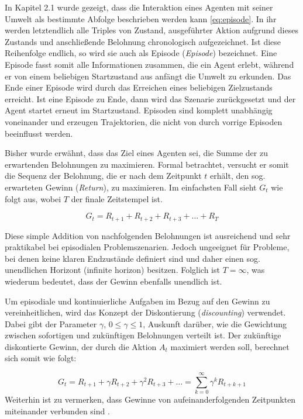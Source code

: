 In Kapitel 2.1 wurde gezeigt, dass die Interaktion eines Agenten mit seiner Umwelt als bestimmte Abfolge beschrieben werden kann \eqref{eq:episode}. In ihr werden letztendlich alle Triples von Zustand, ausgeführter Aktion aufgrund dieses Zustands und anschließende Belohnung chronologisch aufgezeichnet. Ist diese Reihenfolge endlich, so wird sie auch als Episode (\textit{Episode}) bezeichnet. Eine Episode fasst somit alle Informationen zusammen, die ein Agent erlebt, während er von einem beliebigen Startzustand aus anfängt die Umwelt zu erkunden. Das Ende einer Episode wird durch das Erreichen eines beliebigen Zielzustands erreicht. Ist eine Episode zu Ende, dann wird das Szenarie zurückgesetzt und der Agent startet erneut im Startzustand. Episoden sind komplett unabhängig voneinander und erzeugen Trajektorien, die nicht von durch vorrige Episoden beeinflusst werden.
\par
Bisher wurde erwähnt, dass das Ziel eines Agenten sei, die Summe der zu erwartenden Belohnungen zu maximieren. Formal betrachtet, versucht er somit die Sequenz der Belohnung, die er nach dem Zeitpunkt $t$ erhält, den sog. erwarteten Gewinn (\textit{Return}), zu maximieren. Im einfachsten Fall sieht $G_t$ wie folgt aus, wobei $T$ der finale Zeitstempel ist.

\begin{equation}\label{eq:simpleReturn}
    G_t = R_{t+1} + R_{t+2} + R_{t+3} + \dots + R_{T}
\end{equation}

Diese simple Addition von nachfolgenden Belohnungen ist ausreichend und sehr praktikabel bei episodialen Problemszenarien. Jedoch ungeeignet für Probleme, bei denen keine klaren Endzustände definiert sind und daher einen sog. unendlichen Horizont (infinite horizon) besitzen. Folglich ist  $T=\infty$, was wiederum bedeutet, dass der Gewinn ebenfalls unendlich ist. 
\par 
Um episodiale und kontinuierliche Aufgaben im Bezug auf den Gewinn zu vereinheitlichen, wird das Konzept der Diskontierung (\textit{discounting}) verwendet. Dabei gibt der Parameter $\gamma$, $0\leq \gamma \leq 1$, Auskunft darüber, wie die Gewichtung zwischen sofortigen und zukünftigen Belohnungen verteilt ist. Der zukünftige diskontierte Gewinn, der durch die Aktion $A_t$ maximiert werden soll, berechnet sich somit wie folgt:

\begin{equation}\label{eq:discountedReturn}
    G_t = R_{t+1} + \gamma R_{t+2} + \gamma^2 R_{t+3} + \dots  = \sum_{k=0}^\infty{\gamma^k R_{t+k+1}}
\end{equation}
Weiterhin ist zu vermerken, dass Gewinne von aufeinanderfolgenden Zeitpunkten miteinander verbunden sind \cite[S.55]{Sutton1998}.

